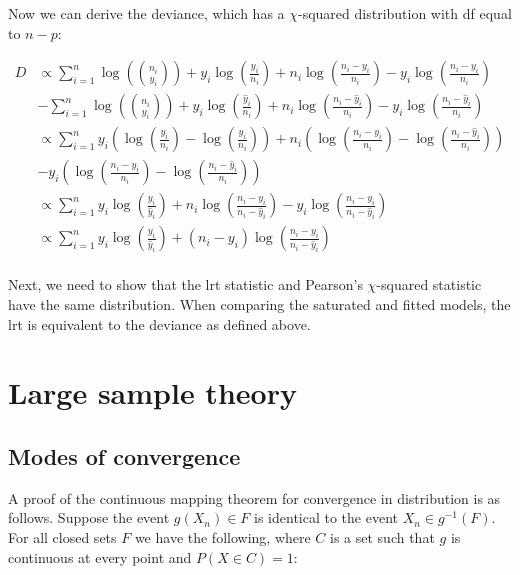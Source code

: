 \documentclass{report}
\begin{document}
Now we can derive the deviance, which has a $\chi$-squared distribution with \gls{df} equal to $n-p$:

\begin{equation}\label{eq:ex-glm-2023-q5-overall-deviance-2}
    \begin{split}
        D
          &\propto \sum_{i=1}^n \log\left(\binom{n_i}{y_i}\right) + y_i\log\left(\frac{y_i}{n_i}\right) + n_i\log\left(\frac{n_i-y_i}{n_i}\right) - y_i\log\left(\frac{n_i-y_i}{n_i}\right) \\ &-  \sum_{i=1}^n \log\left(\binom{n_i}{y_i}\right) + y_i\log\left(\frac{\hat{y}_i}{n_i}\right) + n_i\log\left(\frac{n_i - \hat{y}_i}{n_i}\right) - y_i\log\left(\frac{n_i - \hat{y}_i}{n_i}\right) \\
          &\propto \sum_{i=1}^n y_i \left(\log\left(\frac{y_i}{n_i}\right) - \log\left(\frac{\hat{y}_i}{n_i}\right)\right) + n_i \left(\log\left(\frac{n_i-y_i}{n_i}\right) - \log\left(\frac{n_i-\hat{y}_i}{n_i}\right)\right) \\ &- y_i \left(\log\left(\frac{n_i-y_i}{n_i}\right) - \log\left(\frac{n_i - \hat{y}_i}{n_i}\right)\right) \\
          &\propto \sum_{i=1}^n y_i \log\left(\frac{y_i}{\hat{y}_i}\right) + n_i \log\left(\frac{n_i-y_i}{n_i-\hat{y}_i}\right) - y_i\log\left(\frac{n_i-y_i}{n_i-\hat{y}_i}\right) \\
          &\propto \sum_{i=1}^n y_i \log\left(\frac{y_i}{\hat{y}_i}\right) + (n_i-y_i) \log\left(\frac{n_i-y_i}{n_i-\hat{y}_i}\right) \\
    \end{split}
\end{equation}

Next, we need to show that the \gls{lrt} statistic and Pearson's $\chi$-squared statistic have the same distribution. When comparing the saturated and fitted models, the \gls{lrt} is equivalent to the deviance as defined above. 

\section{Large sample theory}\label{sec:examples-lst}

\subsection{Modes of convergence}

A proof of the continuous mapping theorem for convergence in distribution is as follows. Suppose the event $g(X_n) \in F$ is identical to the event $X_n \in g^{-1}(F)$. For all closed sets $F$ we have the following, where $C$ is a set such that $g$ is continuous at every point and $P(X \in C) = 1$:
\end{document}
